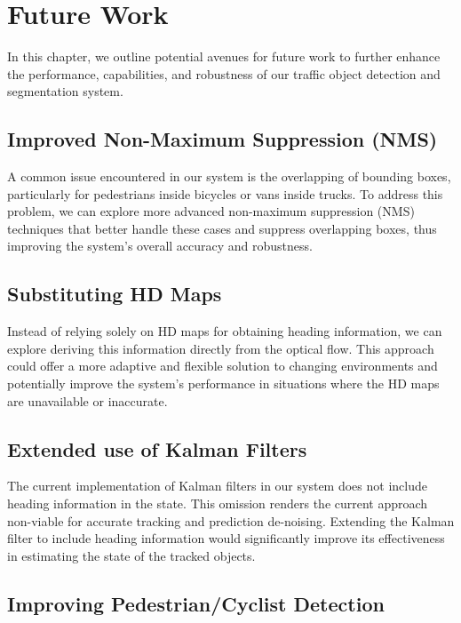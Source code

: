 
\chapter{Future Work}
\label{ch:future}

In this chapter, we outline potential avenues for future work to further enhance the performance, capabilities, and robustness of our traffic object detection and segmentation system.

\section{Improved Non-Maximum Suppression (NMS)}
\label{sec:nms}

A common issue encountered in our system is the overlapping of bounding boxes, particularly for pedestrians inside bicycles or vans inside trucks.
To address this problem, we can explore more advanced non-maximum suppression (NMS) techniques that better handle these cases and suppress overlapping boxes, thus improving the system's overall accuracy and robustness.

\section{Substituting HD Maps}
\label{sec:nomap}

Instead of relying solely on HD maps for obtaining heading information, we can explore deriving this information directly from the optical flow.
This approach could offer a more adaptive and flexible solution to changing environments and potentially improve the system's performance in situations where the HD maps are unavailable or inaccurate.

\section{Extended use of Kalman Filters}
\label{sec:extkalman}

The current implementation of Kalman filters in our system does not include heading information in the state.
This omission renders the current approach non-viable for accurate tracking and prediction de-noising.
Extending the Kalman filter to include heading information would significantly improve its effectiveness in estimating the state of the tracked objects.

\section{Improving Pedestrian/Cyclist Detection}
\label{sec:improvepedcyclist}


